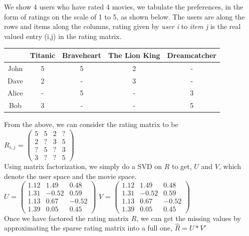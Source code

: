  \begin{example}
   We show 4 users who have rated 4 movies, we tabulate the preferences, in the
form of ratings on the scale of 1 to 5,  as shown below. The users are along the
rows and items along the columns, rating  given by \textit{user i} to
\textit{item j} is the real valued entry (i,j) in  the rating matrix.  \\

\begin{tabular}{c|cccc}
       & Titanic & Braveheart & The Lion King & Dreamcatcher  \\
\hline
John   & 5 & 5 & 2 & -   \\
Dave   & 2 & - & 3 & -   \\
Alice  & - & 5 & - & 3   \\
Bob    & 3 & - & - & 5   \\
\end{tabular}

From the above, we can consider the rating matrix to be \\

$R_{i,j}$ =
$ \begin{pmatrix}
  5 & 5 & 2 & ? \\
  2 & ? & 3 & 5 \\
  ? & 5 & ? & 3  \\
  3 & ? & ? & 5
 \end{pmatrix} $\\
 
 Using matrix factorization, we simply do a SVD on $R$ to get, $U$ and $V$,
which denote the user space and the movie space. \\
 
 $U$ =
 $\begin{pmatrix}
  1.12 & 1.49 & 0.48  \\
  1.31 & -0.52 & 0.59  \\
  1.13 & 0.67 & -0.52  \\
  1.39 & 0.05 & 0.45 
 \end{pmatrix} $
 \hspace*{10mm}
 $V$ =
 $\begin{pmatrix}
  1.12 & 1.49 & 0.48  \\
  1.31 & -0.52 & 0.59  \\
  1.13 & 0.67 & -0.52  \\
  1.39 & 0.05 & 0.45 
 \end{pmatrix} $\\

 Once we have factored the rating matrix $R$, we can get the missing values by
approximating the sparse rating matrix into a full one,  $\hat{R}=U*V'$ \\


\end{example}
